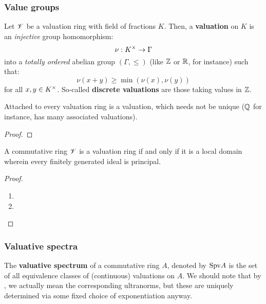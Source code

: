             \subsubsection{Value groups}
                \begin{definition}[Valuations] \label{def: valuations}
                    Let $\mathscr{V}$ be a valuation ring with field of fractions $K$. Then, a \textbf{valuation} on $K$ is an \textit{injective} group homomorphism:
                        $$\nu: K^{\x} \to \Gamma$$
                    into a \textit{totally ordered} abelian group $(\Gamma, \leq)$ (like $\mathbb{Z}$ or $\mathbb{R}$, for instance) such that:
                        $$\nu(x + y) \geq \min(\nu(x), \nu(y))$$
                    for all $x, y \in K^{\x}$. So-called \textbf{discrete valuations} are those taking values in $\mathbb{Z}$. 
                \end{definition}
                
                \begin{lemma}
                    Attached to every valuation ring is a valuation, which needs not be unique ($\mathbb{Q}$ for instance, has many associated valuations). 
                \end{lemma}
                    \begin{proof}
                        
                    \end{proof}
                \begin{theorem} \label{theorem: principality_and_locality_of_valuation rings}
                    A commutative ring $\mathscr{V}$ is a valuation ring if and only if it is a local domain wherein every finitely generated ideal is principal.
                \end{theorem}
                    \begin{proof}
                        \noindent
                        \begin{enumerate}
                            \item  
                            \item 
                        \end{enumerate}
                    \end{proof}
                    
            \subsubsection{Valuative spectra}
                \begin{definition} \label{def: valuative_spectra}
                    The \textbf{valuative spectrum} of a commutative ring $A$, denoted by $\mathrm{Spv} A$ is the set of all equivalence classes of (continuous) valuations on $A$. We should note that by , we actually mean the corresponding ultranorms, but these are uniquely determined via some fixed choice of exponentiation anyway.
                \end{definition}
                
